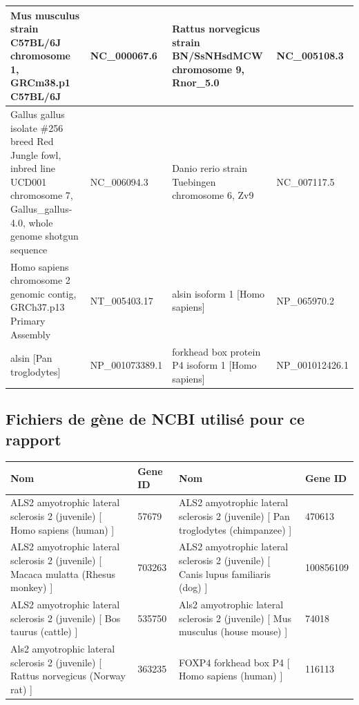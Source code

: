 \documentclass[10.9pt]{article} %
\begin{document}
{\begin{longtable}{|p{4.5cm}|p{3.5cm}|p{4.5cm}|p{3.5cm}|}
 \hline
    Mus musculus strain C57BL/6J chromosome 1, GRCm38.p1 C57BL/6J & NC\_000067.6 &  Rattus norvegicus strain BN/SsNHsdMCW chromosome 9, Rnor\_5.0 &  NC\_005108.3 \\
 \hline
  Gallus gallus isolate \#256 breed Red Jungle fowl, inbred line UCD001 chromosome 7, Gallus\_gallus-4.0, whole genome shotgun sequence & NC\_006094.3 &  Danio rerio strain Tuebingen chromosome 6, Zv9 &  NC\_007117.5 \\
 \hline
 Homo sapiens chromosome 2 genomic contig, GRCh37.p13 Primary Assembly & NT\_005403.17 &  alsin isoform 1 [Homo sapiens] & NP\_065970.2 \\
 \hline
  alsin [Pan troglodytes] & NP\_001073389.1 &  forkhead box protein P4 isoform 1 [Homo sapiens] & NP\_001012426.1 \\
 \hline
\end{longtable}
}

\subsection{Fichiers de gène de NCBI utilisé pour ce rapport}\label{27}

 \footnotesize{
\begin{longtable}{|p{4.5cm}|p{3.5cm}|p{4.5cm}|p{3.5cm}|}
\hline
 Nom & Gene ID & Nom & Gene ID\\
 \hline \endhead
 ALS2 amyotrophic lateral sclerosis 2 (juvenile) [ Homo sapiens (human) ]  & 57679 & ALS2 amyotrophic lateral sclerosis 2 (juvenile) [ Pan troglodytes (chimpanzee) ]  & 470613 \\
 \hline
 ALS2 amyotrophic lateral sclerosis 2 (juvenile) [ Macaca mulatta (Rhesus monkey) ] & 703263 & ALS2 amyotrophic lateral sclerosis 2 (juvenile) [ Canis lupus familiaris (dog) ] & 100856109 \\
 \hline
  ALS2 amyotrophic lateral sclerosis 2 (juvenile) [ Bos taurus (cattle) ]  & 535750 & Als2 amyotrophic lateral sclerosis 2 (juvenile) [ Mus musculus (house mouse) ] & 74018 \\
 \hline
   Als2 amyotrophic lateral sclerosis 2 (juvenile) [ Rattus norvegicus (Norway rat) ]  & 363235 & FOXP4 forkhead box P4 [ Homo sapiens (human) ] & 116113 \\
 \hline
 \end{longtable}
 }
\endgroup
\end{document}
